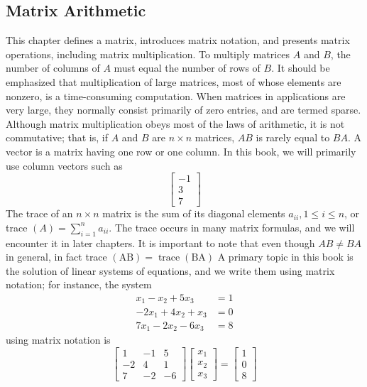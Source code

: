 \documentclass[../main.tex]{subfiles}
\begin{document}
\subsection*{Matrix Arithmetic}
This chapter defines a matrix, introduces matrix notation, and presents matrix operations, including matrix multiplication. To multiply matrices $A$ and $B$, the number of columns of $A$ must equal the number of rows of $B$. It should be emphasized that multiplication of large matrices, most of whose elements are nonzero, is a time-consuming computation. When matrices in applications are very large, they normally consist primarily of zero entries, and are termed sparse. Although matrix multiplication obeys most of the laws of arithmetic, it is not commutative; that is, if $A$ and $B$ are $n \times n$ matrices, $A B$ is rarely equal to $B A$. A vector is a matrix having one row or one column. In this book, we will primarily use column vectors such as
$$
\left[\begin{array}{c}
-1 \\
3 \\
7
\end{array}\right]
$$
The trace of an $n \times n$ matrix is the sum of its diagonal elements $a_{i i}, 1 \leq i \leq n$, or trace $(A)=\sum_{i=1}^{n} a_{i i} .$ The trace occurs in many matrix formulas, and we will encounter it in later chapters. It is important to note that even though $A B \neq B A$ in general, in fact trace $(\mathrm{AB})=\operatorname{trace}(\mathrm{BA})$
A primary topic in this book is the solution of linear systems of equations, and we write them using matrix notation; for instance, the system
$$
\begin{aligned}
x_{1}-x_{2}+5 x_{3} &=1 \\
-2 x_{1}+4 x_{2}+x_{3} &=0 \\
7 x_{1}-2 x_{2}-6 x_{3} &=8
\end{aligned}
$$
using matrix notation is
$$
\left[\begin{array}{ccc}
1 & -1 & 5 \\
-2 & 4 & 1 \\
7 & -2 & -6
\end{array}\right]\left[\begin{array}{l}
x_{1} \\
x_{2} \\
x_{3}
\end{array}\right]=\left[\begin{array}{l}
1 \\
0 \\
8
\end{array}\right]
$$
\end{document}
